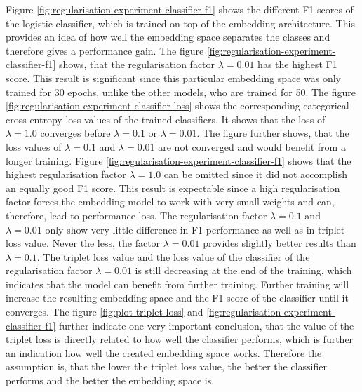 \newline
\newline
\noindent
Figure \ref{fig:regularisation-experiment-classifier-f1} shows the different F1 scores of the logistic classifier, which is trained on top of the embedding architecture. This provides an idea of how well the embedding space separates the classes and therefore gives a performance gain. The figure \ref{fig:regularisation-experiment-classifier-f1} shows, that the regularisation factor $\lambda = 0.01$ has the highest F1 score. This result is significant since this particular embedding space was only trained for 30 epochs, unlike the other models, who are trained for 50. 
\newline
\newline
The figure \ref{fig:regularisation-experiment-classifier-loss} shows the corresponding categorical cross-entropy loss values of the trained classifiers. It shows that the loss of $\lambda = 1.0$ converges before $\lambda = 0.1$ or $\lambda = 0.01$. The figure further shows, that the loss values of $\lambda = 0.1$ and $\lambda = 0.01$ are not converged and would benefit from a longer training.
\newline
\newline
Figure \ref{fig:regularisation-experiment-classifier-f1} shows that the highest regularisation factor $\lambda = 1.0$ can be omitted since it did not accomplish an equally good F1 score. This result is expectable since a high regularisation factor forces the embedding model to work with very small weights and can, therefore, lead to performance loss. 
\newline
\newline
The regularisation factor $\lambda = 0.1$ and $\lambda = 0.01$ only show very little difference in F1 performance as well as in triplet loss value. Never the less, the factor $\lambda = 0.01$ provides slightly better results than $\lambda = 0.1$. 
\newline
\newline
The triplet loss value and the loss value of the classifier of the regularisation factor $\lambda = 0.01$ is still decreasing at the end of the training, which indicates that the model can benefit from further training. Further training will increase the resulting embedding space and the F1 score of the classifier until it converges.
\newline
\newline
The figure \ref{fig:plot-triplet-loss} and \ref{fig:regularisation-experiment-classifier-f1} further indicate one very important conclusion, that the value of the triplet loss is directly related to how well the classifier performs, which is further an indication how well the created embedding space works. Therefore the assumption is, that the lower the triplet loss value, the better the classifier performs and the better the embedding space is. 
